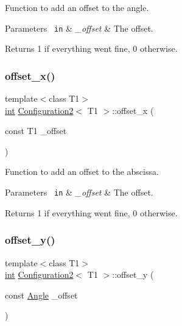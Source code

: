 Function to add an offset to the angle. 


\begin{DoxyParams}[1]{Parameters}
\mbox{\texttt{ in}}  & {\em \+\_\+offset} & The offset. \\
\hline
\end{DoxyParams}
\begin{DoxyReturn}{Returns}
1 if everything went fine, 0 otherwise. 
\end{DoxyReturn}
\mbox{\label{class_configuration2_a49f13949ff2fbeefdac31bc0f9e13dab}} 
\subsubsection{\texorpdfstring{offset\_x()}{offset\_x()}}
{\footnotesize\ttfamily template$<$class T1$>$ \\
\mbox{\hyperlink{draw_8hh_aa620a13339ac3a1177c86edc549fda9b}{int}} \mbox{\hyperlink{class_configuration2}{Configuration2}}$<$ T1 $>$\+::offset\+\_\+x (\begin{DoxyParamCaption}\item[{const T1}]{\+\_\+offset }\end{DoxyParamCaption})\hspace{0.3cm}{\ttfamily [inline]}}



Function to add an offset to the abscissa. 


\begin{DoxyParams}[1]{Parameters}
\mbox{\texttt{ in}}  & {\em \+\_\+offset} & The offset. \\
\hline
\end{DoxyParams}
\begin{DoxyReturn}{Returns}
1 if everything went fine, 0 otherwise. 
\end{DoxyReturn}
\mbox{\label{class_configuration2_ae29330a14b06e1ecb22a6bee4e954f81}} 
\subsubsection{\texorpdfstring{offset\_y()}{offset\_y()}}
{\footnotesize\ttfamily template$<$class T1$>$ \\
\mbox{\hyperlink{draw_8hh_aa620a13339ac3a1177c86edc549fda9b}{int}} \mbox{\hyperlink{class_configuration2}{Configuration2}}$<$ T1 $>$\+::offset\+\_\+y (\begin{DoxyParamCaption}\item[{const \mbox{\hyperlink{class_angle}{Angle}}}]{\+\_\+offset }\end{DoxyParamCaption})\hspace{0.3cm}{\ttfamily [inline]}}



